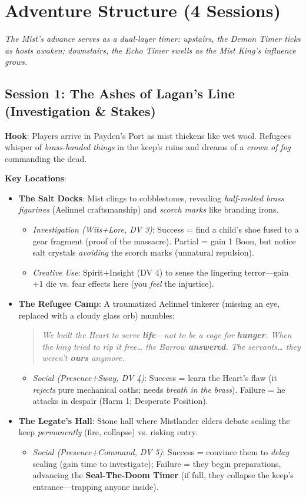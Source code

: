 \documentclass[12pt]{article}
\begin{document}
\section{Adventure Structure (4 Sessions)}
\textit{The Mist's advance serves as a dual-layer timer: upstairs, the Demon Timer ticks as hosts awaken; downstairs, the Echo Timer swells as the Mist King's influence grows.}

\subsection{Session 1: The Ashes of Lagan's Line (Investigation \& Stakes)}
\textbf{Hook}: Players arrive in Payden's Port as mist thickens like wet wool. Refugees whisper of \textit{brass-handed things} in the keep's ruins and dreams of a \textit{crown of fog} commanding the dead.

\textbf{Key Locations}:
\begin{itemize}
  \item \textbf{The Salt Docks}: Mist clings to cobblestones, revealing \textit{half-melted brass figurines} (Aelinnel craftsmanship) and \textit{scorch marks} like branding irons.
  \begin{itemize}
    \item \textit{Investigation (Wits+Lore, DV 3)}: Success = find a child's shoe fused to a gear fragment (proof of the massacre). Partial = gain 1 Boon, but notice salt crystals \textit{avoiding} the scorch marks (unnatural repulsion).
    \item \textit{Creative Use}: Spirit+Insight (DV 4) to sense the lingering terror---gain +1 die vs. fear effects here (you \textit{feel} the injustice).
  \end{itemize}
  \item \textbf{The Refugee Camp}: A traumatized Aelinnel tinkerer (missing an eye, replaced with a cloudy glass orb) mumbles:
  \begin{quote}
    \textit{We built the Heart to serve \textbf{life}---not to be a cage for \textbf{hunger}. When the king tried to rip it free\ldots{} the Barrow \textbf{answered}. The servants\ldots{} they weren't \textbf{ours} anymore.}
  \end{quote}
  \begin{itemize}
    \item \textit{Social (Presence+Sway, DV 4)}: Success = learn the Heart's flaw (it \textit{rejects} pure mechanical oaths; needs \textit{breath in the brass}). Failure = he attacks in despair (Harm 1; Desperate Position).
  \end{itemize}
  \item \textbf{The Legate's Hall}: Stone hall where Mistlander elders debate sealing the keep \textit{permanently} (fire, collapse) vs. risking entry.
  \begin{itemize}
    \item \textit{Social (Presence+Command, DV 5)}: Success = convince them to \textit{delay} sealing (gain time to investigate); Failure = they begin preparations, advancing the \textbf{Seal-The-Doom Timer } (if full, they collapse the keep's entrance---trapping anyone inside).
  \end{itemize}
\end{itemize}
\end{document}
